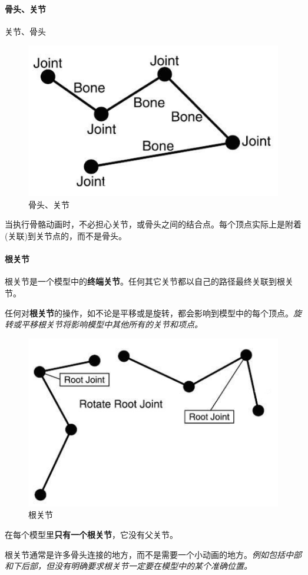 \documentclass[UTF8,a4paper,12pt]{ctexbook}
\begin{document}
			\paragraph{骨头、关节}
				关节、骨头
				
				\begin{figure}[H]
					\centering
					\includegraphics[width=.6\linewidth]{SkeletonTheory01}
					\caption{骨头、关节}
				\end{figure}
				
				当执行骨骼动画时，不必担心关节，或骨头之间的结合点。每个顶点实际上是附着(关联)到关节点的，而不是骨头。
			
			\paragraph{根关节}
				根关节是一个模型中的\textbf{终端关节}。任何其它关节都以自己的路径最终关联到根关节。
				
				任何对\textbf{根关节}的操作，如不论是平移或是旋转，都会影响到模型中的每个顶点。\textit{旋转或平移根关节将影响模型中其他所有的关节和项点。}
				
					\begin{figure}[H]
						\centering
						\includegraphics[width=.6\linewidth]{SkeletonTheory02}
						\caption{根关节}
					\end{figure}
				
				在每个模型里\textbf{只有一个根关节}，它没有父关节。
				
				根关节通常是许多骨头连接的地方，而不是需要一个小动画的地方。\textit{例如包括中部和下后部，但没有明确要求根关节一定要在模型中的某个准确位置。}
			
\end{document}
